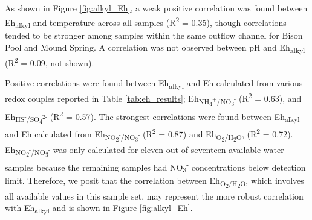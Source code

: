 





As shown in Figure \ref{fig:alkyl_Eh}, a weak positive correlation was found between Eh\textsubscript{alkyl} and temperature across all samples (R\textsuperscript{2} = 0.35), though correlations tended to be stronger among samples within the same outflow channel for Bison Pool and Mound Spring. A correlation was not observed between pH and Eh\textsubscript{alkyl} (R\textsuperscript{2} = 0.09, not shown).

Positive correlations were found between Eh\textsubscript{alkyl} and Eh calculated from various redox couples reported in Table \ref{tab:eh_results}; Eh\textsubscript{NH\textsubscript{4}\textsuperscript{+}/NO\textsubscript{3}\textsuperscript{-}} (R\textsuperscript{2} = 0.63), and Eh\textsubscript{HS\textsuperscript{-}/SO\textsubscript{4}\textsuperscript{2-}} (R\textsuperscript{2} = 0.57). The strongest correlations were found between Eh\textsubscript{alkyl} and Eh calculated from Eh\textsubscript{NO\textsubscript{2}\textsuperscript{-}/NO\textsubscript{3}\textsuperscript{-}} (R\textsuperscript{2} = 0.87) and Eh\textsubscript{O\textsubscript{2}/H\textsubscript{2}O}, (R\textsuperscript{2} = 0.72). Eh\textsubscript{NO\textsubscript{2}\textsuperscript{-}/NO\textsubscript{3}\textsuperscript{-}} was only calculated for eleven out of seventeen available water samples because the remaining samples had NO\textsubscript{3}\textsuperscript{-} concentrations below detection limit. Therefore, we posit that the correlation between Eh\textsubscript{O\textsubscript{2}/H\textsubscript{2}O}, which involves all available values in this sample set, may represent the more robust correlation with Eh\textsubscript{alkyl} and is shown in Figure \ref{fig:alkyl_Eh}.


